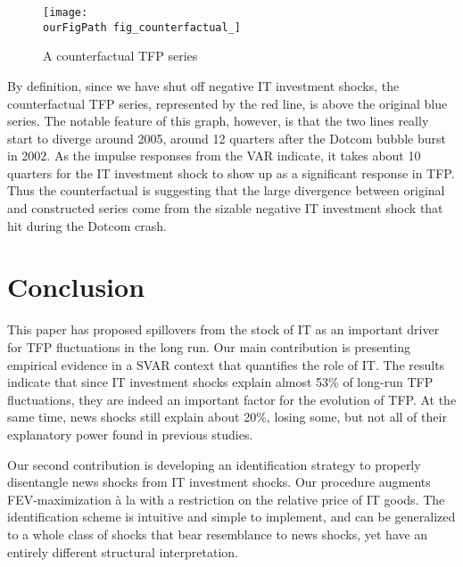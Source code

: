 \documentclass[11pt]{article}
\def \ourFigPath {../../Figures/}
\renewcommand{\[}{\begin{equation}}
\renewcommand{\]}{\end{equation}}
\begin{document}
\begin{figure}[h!]
\caption{A counterfactual TFP series}
\label{fig_counter}

\vspace{0.5cm}
	\centering
	\texttt{[image: \\ourFigPath fig\_counterfactual\_]}
\end{figure}

By definition, since we have shut off negative IT investment shocks, the counterfactual TFP series, represented by the red line, is above the original blue series. The notable feature of this graph, however, is that the two lines really start to diverge around 2005, around 12 quarters after the Dotcom bubble burst in 2002. As the impulse responses from the VAR indicate, it takes about 10 quarters for the IT investment shock to show up as a significant response in TFP. Thus the counterfactual is suggesting that the large divergence between original and constructed series come from the sizable negative IT investment shock that hit during the Dotcom crash. 

\section{Conclusion}
\label{sec_conclusion}
This paper has proposed spillovers from the stock of IT as an important driver for TFP fluctuations in the long run. Our main contribution is presenting empirical evidence in a SVAR context that quantifies the role of IT. The results indicate that since IT investment shocks explain almost 53\% of long-run TFP fluctuations, they are indeed an important factor for the evolution of TFP. At the same time, news shocks still explain about 20\%, losing some, but not all of their explanatory power found in previous studies.

Our second contribution is developing an identification strategy to properly disentangle news shocks from IT investment shocks. Our procedure augments FEV-maximization \`a la \cite{barsky_sims2011} with a restriction on the relative price of IT goods. The identification scheme is intuitive and simple to implement, and can be generalized to a whole class of shocks that bear resemblance to news shocks, yet have an entirely different structural interpretation. 



\newpage
\nocite{*}
 
 
 
\end{document}
